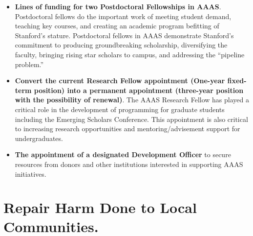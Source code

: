 \documentclass[12pt, titlepage, letterpaper]{article}
\begin{document}
\begin{itemize}[itemsep=1em]
\item{\textbf{Lines of funding for two Postdoctoral Fellowships in AAAS}. Postdoctoral fellows do the important work of meeting student demand, teaching key courses, and creating an academic program befitting of Stanford’s stature. Postdoctoral fellows in AAAS demonstrate Stanford’s commitment to producing groundbreaking scholarship, diversifying the faculty, bringing rising star scholars to campus, and addressing the “pipeline problem.”}

\item{\textbf{Convert the current Research Fellow appointment (One-year fixed-term position) into a permanent appointment (three-year position with the possibility of renewal)}. The AAAS Research Fellow has played a critical role in the development of programming for graduate students including the Emerging Scholars Conference. This appointment is also critical to increasing research opportunities and mentoring/advisement support for undergraduates.}

\item\textbf{The appointment of a designated Development Officer} to secure resources from donors and other institutions interested in supporting AAAS initiatives.

\end{itemize}%

\newpage
\section*{Repair Harm Done to Local Communities.}
%
\vspace{0.3em}
\hline\hline
\end{document}
